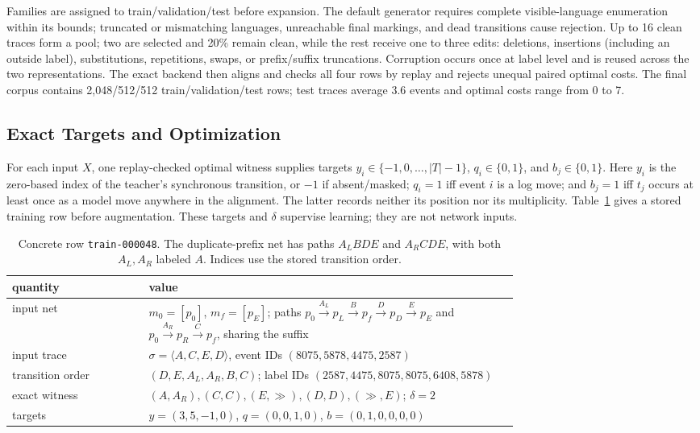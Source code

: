 \documentclass[manuscript,screen,nonacm]{acmart}
\begin{document}
Families are assigned to train/validation/test before expansion. The default generator requires complete visible-language enumeration within its bounds; truncated or mismatching languages, unreachable final markings, and dead transitions cause rejection. Up to 16 clean traces form a pool; two are selected and 20\% remain clean, while the rest receive one to three edits: deletions, insertions (including an outside label), substitutions, repetitions, swaps, or prefix/suffix truncations. Corruption occurs once at label level and is reused across the two representations. The exact backend then aligns and checks all four rows by replay and rejects unequal paired optimal costs. The final corpus contains 2{,}048/512/512 train/validation/test rows; test traces average 3.6 events and optimal costs range from 0 to 7.

\subsection{Exact Targets and Optimization}
\label{sec:training}

For each input $X$, one replay-checked optimal witness supplies targets $y_i\in\{-1,0,\ldots,|T|-1\}$, $q_i\in\{0,1\}$, and $b_j\in\{0,1\}$. Here $y_i$ is the zero-based index of the teacher's synchronous transition, or $-1$ if absent/masked; $q_i=1$ iff event $i$ is a log move; and $b_j=1$ iff $t_j$ occurs at least once as a model move anywhere in the alignment. The latter records neither its position nor its multiplicity. Table~\ref{tab:training-row} gives a stored training row before augmentation. These targets and $\delta$ supervise learning; they are not network inputs.

\begin{table}[H]
\centering
\caption{Concrete row \texttt{train-000048}. The duplicate-prefix net has paths $A_LBDE$ and $A_RCDE$, with both $A_L,A_R$ labeled $A$. Indices use the stored transition order.}
\label{tab:training-row}
\footnotesize
\begin{tabular}{@{}lp{0.73\linewidth}@{}}
\toprule
quantity & value\\
\midrule
input net & $m_0=[p_0]$, $m_f=[p_E]$; paths $p_0\xrightarrow{A_L}p_L\xrightarrow{B}p_f\xrightarrow{D}p_D\xrightarrow{E}p_E$ and $p_0\xrightarrow{A_R}p_R\xrightarrow{C}p_f$, sharing the suffix\\
input trace & $\sigma=\langle A,C,E,D\rangle$, event IDs $(8075,5878,4475,2587)$\\
transition order & $(D,E,A_L,A_R,B,C)$; label IDs $(2587,4475,8075,8075,6408,5878)$\\
exact witness & $(A,A_R),(C,C),(E,\gg),(D,D),(\gg,E)$; $\delta=2$\\
targets & $y=(3,5,-1,0)$, $q=(0,0,1,0)$, $b=(0,1,0,0,0,0)$\\
\bottomrule
\end{tabular}
\end{table}
\end{document}
